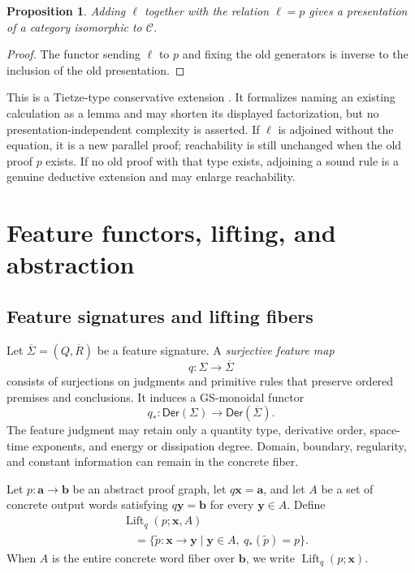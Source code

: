 \documentclass[10pt,journal,a4paper]{IEEEtran}
\newtheorem{proposition}[theorem]{Proposition}
\theoremstyle{definition}
\begin{document}
\begin{proposition}
Adding $\ell$ together with the relation $\ell=p$ gives a presentation of a category isomorphic to $\mathcal C$.
\end{proposition}

\begin{proof}
The functor sending $\ell$ to $p$ and fixing the old generators is inverse to the inclusion of the old presentation.
\end{proof}

This is a Tietze-type conservative extension \cite{HenryMimram2022}. It formalizes naming an existing calculation as a lemma and may shorten its displayed factorization, but no presentation-independent complexity is asserted. If $\ell$ is adjoined without the equation, it is a new parallel proof; reachability is still unchanged when the old proof $p$ exists. If no old proof with that type exists, adjoining a sound rule is a genuine deductive extension and may enlarge reachability.

\section{Feature functors, lifting, and abstraction}

\subsection{Feature signatures and lifting fibers}

Let $\overline\Sigma=(Q,\overline R)$ be a feature signature. A \emph{surjective feature map}
\[
  q:\Sigma\longrightarrow\overline\Sigma
\]
consists of surjections on judgments and primitive rules that preserve ordered premises and conclusions. It induces a GS-monoidal functor
\[
  q_*:\mathsf{Der}(\Sigma)
  \longrightarrow
  \mathsf{Der}(\overline\Sigma).
\]
The feature judgment may retain only a quantity type, derivative order, space-time exponents, and energy or dissipation degree. Domain, boundary, regularity, and constant information can remain in the concrete fiber.

Let $p:\mathbf a\to\mathbf b$ be an abstract proof graph, let $q\mathbf x=\mathbf a$, and let $A$ be a set of concrete output words satisfying $q\mathbf y=\mathbf b$ for every $\mathbf y\in A$. Define
\[
\begin{aligned}
  &\operatorname{Lift}_q(p;\mathbf x,A)\\
  &\quad=
  \bigl\{\widetilde p:\mathbf x\to\mathbf y\mid
  \mathbf y\in A,\ q_*(\widetilde p)=p\bigr\}.
\end{aligned}
\]
When $A$ is the entire concrete word fiber over $\mathbf b$, we write $\operatorname{Lift}_q(p;\mathbf x)$.
\end{document}
